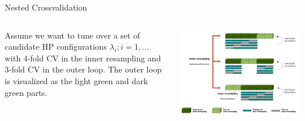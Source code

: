\begin{frame}{Nested Crossvalidation}





\framebreak

\vspace{1cm}
\begin{columns}[c, onlytextwidth]
\hspace*{-0.3cm}
Assume we want to tune over a set of candidate HP configurations $\lambda_i; i = 1, \dots$ with 4-fold CV in the inner resampling and 3-fold CV in the outer loop. The outer loop is visualized as the light green and dark green parts.

\vspace*{-0.3cm}

\begin{center}\includegraphics[width = \textwidth]{images/Nested_Resampling.png}\end{center}
\end{columns}


\end{frame}
